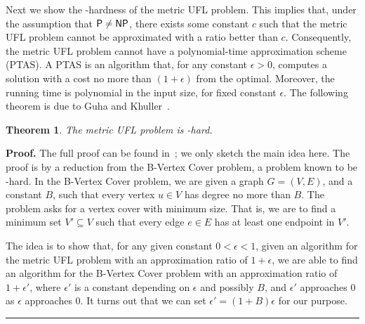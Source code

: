 \documentclass[oneside,final]{ucr}
\newtheorem{theorem}{Theorem}
\newenvironment{proof}[1][Proof]{\textbf{#1.} }{\ \rule{0.5em}{0.5em}}
\begin{document}
Next we show the {\MaxSNP}-hardness of the metric UFL
problem. This implies that, under the assumption that ${\mbox{\sf P}}
\neq {\mbox{\sf NP}}$, there exists some constant $c$ such that the
metric UFL problem cannot be approximated with a ratio
better than $c$. Consequently, the metric UFL problem cannot
have a polynomial-time approximation scheme (PTAS).  A PTAS
is an algorithm that, for any constant $\epsilon > 0$,
computes a solution with a cost no more than $(1+\epsilon)$
from the optimal. Moreover, the running time is polynomial
in the input size, for fixed constant $\epsilon$. The
following theorem is due to Guha and Khuller~\cite{GuhaK98}.

\begin{theorem}\label{thm:maxsnp} \cite{GuhaK98}
  The metric UFL problem is {\MaxSNP}-hard.
\end{theorem}
\begin{proof}
  The full proof can be found in~\cite{GuhaK98}; we only
  sketch the main idea here. The proof is by a reduction
  from the B-Vertex Cover problem, a problem known to be
  {\MaxSNP}-hard. In the B-Vertex Cover problem, we are
  given a graph $G=(V,E)$, and a constant $B$, such that
  every vertex $u\in V$ has degree no more than $B$. The
  problem asks for a vertex cover with minimum size. That
  is, we are to find a minimum set $V' \subseteq V$ such
  that every edge $e \in E$ has at least one endpoint in
  $V'$.

  The idea is to show that, for any given constant $0 <
  \epsilon < 1$, given an algorithm for the metric UFL
  problem with an approximation ratio of $1+\epsilon$, we
  are able to find an algorithm for the B-Vertex Cover
  problem with an approximation ratio of $1+\epsilon'$,
  where $\epsilon'$ is a constant depending on $\epsilon$
  and possibly $B$, and $\epsilon'$ approaches $0$ as
  $\epsilon$ approaches $0$. It turns out that we can set
  $\epsilon' = (1+B)\epsilon$ for our purpose.
\end{proof}
\end{document}
